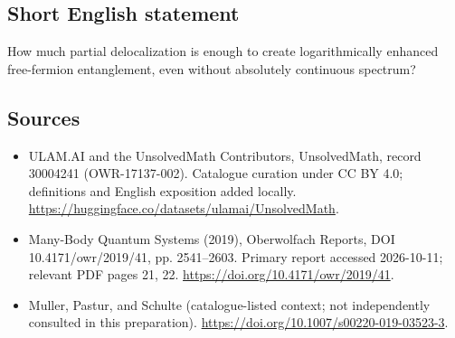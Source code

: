 \documentclass[11pt]{article}
\begin{document}
\subsection{Short English statement}
How much partial delocalization is enough to create logarithmically enhanced free-fermion entanglement, even without absolutely continuous spectrum?
\subsection{Sources}
\begin{itemize}
\item[\hypertarget{source:30004241:1}{S1}] ULAM.AI and the UnsolvedMath Contributors, UnsolvedMath, record 30004241 (OWR-17137-002). Catalogue curation under CC BY 4.0; definitions and English exposition added locally.
\url{https://huggingface.co/datasets/ulamai/UnsolvedMath}.
\item[\hypertarget{source:30004241:2}{S2}] Many-Body Quantum Systems (2019), Oberwolfach Reports, DOI 10.4171/owr/2019/41, pp. 2541--2603. Primary report accessed 2026-10-11; relevant PDF pages 21, 22.
\url{https://doi.org/10.4171/owr/2019/41}.
\item[\hypertarget{source:30004241:3}{S3}] Muller, Pastur, and Schulte (catalogue-listed context; not independently consulted in this preparation).
\url{https://doi.org/10.1007/s00220-019-03523-3}.
\end{itemize}
\label{end:30004241}
\end{document}
